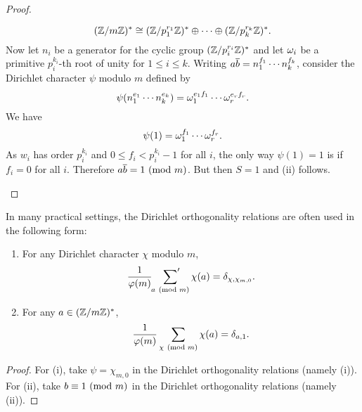 \begin{proof}
\begin{enumerate}[label*=(\roman*)]
        \[
          (\mathbb{Z}/m\mathbb{Z})^{\ast} \cong (\mathbb{Z}/p_{1}^{r_{1}}\mathbb{Z})^{\ast} \oplus \cdots \oplus (\mathbb{Z}/p_{k}^{r_{k}}\mathbb{Z})^{\ast}.
        \]
        Now let $n_{i}$ be a generator for the cyclic group $(\mathbb{Z}/p_{i}^{r_{i}}\mathbb{Z})^{\ast}$ and let $\omega_{i}$ be a primitive $p_{i}^{k_{i}}$-th root of unity for $1 \le i \le k$. Writing $a\overline{b} = n_{1}^{f_{1}} \cdots n_{k}^{f_{k}}$, consider the Dirichlet character $\psi$ modulo $m$ defined by
        \[
          \psi(n_{1}^{e_{1}} \cdots n_{k}^{e_{k}}) = \omega_{1}^{e_{1}f_{1}} \cdots \omega_{r}^{e_{r}f_{r}}.
        \]
        We have
        \[
          \psi(1) = \omega_{1}^{f_{1}} \cdots \omega_{r}^{f_{r}}.
        \]
        As $w_{i}$ has order $p_{i}^{k_{i}}$ and $0 \le f_{i} < p_{i}^{k_{i}}-1$ for all $i$, the only way $\psi(1) = 1$ is if $f_{i} = 0$ for all $i$. Therefore $a\overline{b} = 1 \ (\mathrm{mod}\text{ }m)$. But then $S = 1$ and (ii) follows.
      \end{enumerate}
    \end{proof}

    In many practical settings, the Dirichlet orthogonality relations are often used in the following form:

    \begin{corollary}\label{cor:Dirichlet_orthogonality_relations}
    \phantom{ }
      \begin{enumerate}[label*=(\roman*)]
        \item For any Dirichlet character $\chi$ modulo $m$,
        \[
          \frac{1}{\varphi(m)}\sideset{}{'}\sum_{a \ (\mathrm{mod}\text{ }m)}\chi(a) = \delta_{\chi,\chi_{m,0}}.
        \]
        \item For any $a \in (\mathbb{Z}/m\mathbb{Z})^{\ast}$,
        \[
          \frac{1}{\varphi(m)}\sum_{\chi \ (\mathrm{mod}\text{ }m)}\chi(a) = \delta_{a,1}.
        \]
      \end{enumerate}
    \end{corollary}
    \begin{proof}
      For (i), take $\psi = \chi_{m,0}$ in the Dirichlet orthogonality relations (namely (i)). For (ii), take $b \equiv 1 \ (\mathrm{mod}\text{ }m)$ in the Dirichlet orthogonality relations (namely (ii)).
    \end{proof}

